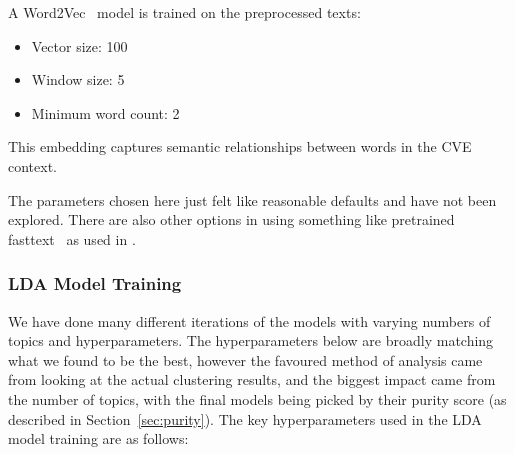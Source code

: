 A Word2Vec~\cite{word2vec} model is trained on the preprocessed texts:

\begin{itemize}
	\item Vector size: 100
	\item Window size: 5
	\item Minimum word count: 2
\end{itemize}

This embedding captures semantic relationships between words in the CVE context.

The parameters chosen here just felt like reasonable defaults and have not been explored. There are also other options in using something like pretrained fasttext~\cite{fasttext} as used in \cite{nvd_clustering_fasttext}.


\subsubsection{LDA Model Training}

We have done many different iterations of the models with varying numbers of topics and hyperparameters. The hyperparameters below are broadly matching what we found to be the best, however the favoured method of analysis came from looking at the actual clustering results, and the biggest impact came from the number of topics, with the final models being picked by their purity score (as described in Section~\ref{sec:purity}). The key hyperparameters used in the LDA model training are as follows:

